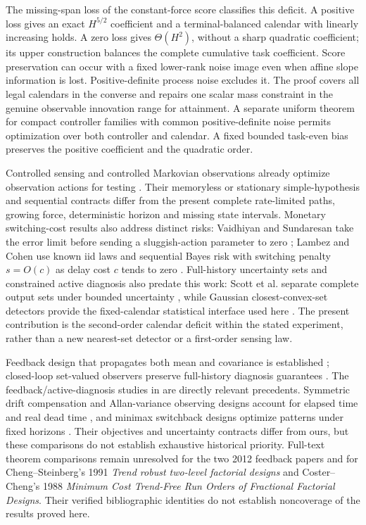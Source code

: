 \documentclass[journal]{IEEEtran}
\begin{document}
The missing-span loss of the constant-force score classifies this deficit.
A positive loss gives an exact $H^{5/2}$ coefficient and a terminal-balanced
calendar with linearly increasing holds. A zero loss gives $\Theta(H^2)$,
without a sharp quadratic coefficient; its upper construction balances the
complete cumulative task coefficient. Score preservation can occur with a
fixed lower-rank noise image even when affine slope information is lost.
Positive-definite process noise excludes it. The proof covers all legal calendars
in the converse and repairs one scalar mass constraint in the genuine observable
innovation range for attainment. A separate uniform theorem for compact
controller families with common positive-definite noise permits optimization
over both controller and calendar. A fixed bounded task-even bias preserves
the positive coefficient and the quadratic order.

Controlled sensing and controlled Markovian observations already optimize
observation actions for testing \cite{controlled,markov}. Their memoryless or
stationary simple-hypothesis and sequential contracts differ from the present
complete rate-limited paths, growing force, deterministic horizon and missing
state intervals. Monetary switching-cost results also address distinct risks:
Vaidhiyan and Sundaresan take the error limit before sending a sluggish-action
parameter to zero \cite{switchcost}; Lambez and Cohen use known iid laws and
sequential Bayes risk with switching penalty $s=O(c)$ as delay cost $c$ tends to zero
\cite{multipleplays}. Full-history uncertainty sets and constrained active diagnosis
also predate this work: Scott et al. separate complete output sets under bounded
uncertainty \cite{zonotope}, while Gaussian closest-convex-set detectors provide
the fixed-calendar statistical interface used here \cite{convex}.
The present contribution is the second-order calendar deficit within the stated
experiment, rather than a new nearest-set detector or a first-order sensing law.

Feedback design that propagates both mean and covariance is established
\cite{kim}; closed-loop set-valued observers preserve full-history diagnosis
guarantees \cite{closedset}. The feedback/active-diagnosis studies in
\cite{feedback2012,robustfeedback2012} are directly relevant precedents.
Symmetric drift compensation and Allan-variance observing designs account for
elapsed time and real dead time \cite{allan,ossenkopf}, and minimax switchback designs
optimize patterns under fixed horizons \cite{switchback}. Their objectives and
uncertainty contracts differ from ours, but these comparisons do not establish
exhaustive historical priority. Full-text theorem comparisons remain unresolved
for the two 2012 feedback papers and for Cheng--Steinberg's 1991
\emph{Trend robust two-level factorial designs} and Coster--Cheng's 1988
\emph{Minimum Cost Trend-Free Run Orders of Fractional Factorial Designs}.
Their verified bibliographic identities do not establish noncoverage of the
results proved here.
\end{document}
